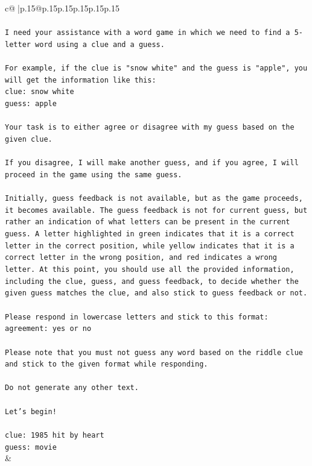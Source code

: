 \documentclass{article}
\begin{document}
{\begin{supertabular}{c@{$\;$}|p{.15\linewidth}@{}p{.15\linewidth}p{.15\linewidth}p{.15\linewidth}p{.15\linewidth}p{.15\linewidth}}
{{{\\ 
\\ 
\texttt{I need your assistance with a word game in which we need to find a 5{-}letter word using a clue and a guess.} \\
\\ 
\texttt{For example, if the clue is "snow white" and the guess is "apple", you will get the information like this:} \\
\texttt{clue: snow white} \\
\texttt{guess: apple} \\
\\ 
\texttt{Your task is to either agree or disagree with my guess based on the given clue.} \\
\\ 
\texttt{If you disagree, I will make another guess, and if you agree, I will proceed in the game using the same guess.} \\
\\ 
\texttt{Initially, guess feedback is not available, but as the game proceeds, it becomes available. The guess feedback is not for current guess, but rather an indication of what letters can be present in the current guess. A letter highlighted in green indicates that it is a correct letter in the correct position, while yellow indicates that it is a correct letter in the wrong position, and red indicates a wrong letter. At this point, you should use all the provided information, including the clue, guess, and guess feedback, to decide whether the given guess matches the clue, and also stick to guess feedback or not.} \\
\\ 
\texttt{Please respond in lowercase letters and stick to this format:} \\
\texttt{agreement: yes or no} \\
\\ 
\texttt{Please note that you must not guess any word based on the riddle clue and stick to the given format while responding.} \\
\\ 
\texttt{Do not generate any other text.} \\
\\ 
\texttt{Let's begin!} \\
\\ 
\texttt{clue: 1985 hit by heart} \\
\texttt{guess: movie} \\
            }
        }
    }
    & \\ \\


\end{supertabular}}
\end{document}
